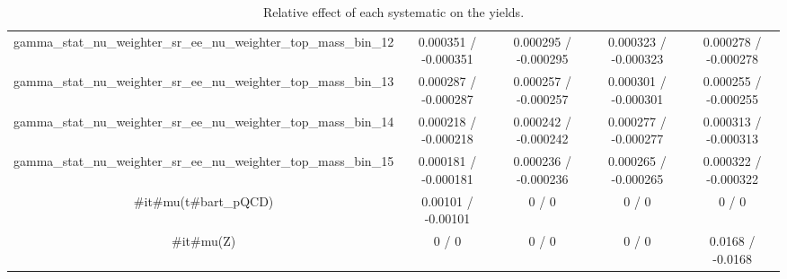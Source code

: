 \documentclass[10pt]{article}
\begin{document}
\begin{table}[htbp]
\begin{center}
\begin{tabular}{|c|c|c|c|c|}
  gamma_stat_nu_weighter_sr_ee_nu_weighter_top_mass_bin_12 & 0.000351 / -0.000351 & 0.000295 / -0.000295 & 0.000323 / -0.000323 & 0.000278 / -0.000278 \\ 
  gamma_stat_nu_weighter_sr_ee_nu_weighter_top_mass_bin_13 & 0.000287 / -0.000287 & 0.000257 / -0.000257 & 0.000301 / -0.000301 & 0.000255 / -0.000255 \\ 
  gamma_stat_nu_weighter_sr_ee_nu_weighter_top_mass_bin_14 & 0.000218 / -0.000218 & 0.000242 / -0.000242 & 0.000277 / -0.000277 & 0.000313 / -0.000313 \\ 
  gamma_stat_nu_weighter_sr_ee_nu_weighter_top_mass_bin_15 & 0.000181 / -0.000181 & 0.000236 / -0.000236 & 0.000265 / -0.000265 & 0.000322 / -0.000322 \\ 
  #it{#mu}(t#bar{t}_{pQCD}) & 0.00101 / -0.00101 & 0 / 0 & 0 / 0 & 0 / 0 \\ 
  #it{#mu}(Z) & 0 / 0 & 0 / 0 & 0 / 0 & 0.0168 / -0.0168 \\ 
\hline 
\end{tabular} 
\caption{Relative effect of each systematic on the yields.} 
\end{center} 
\end{table} 
\end{document}
